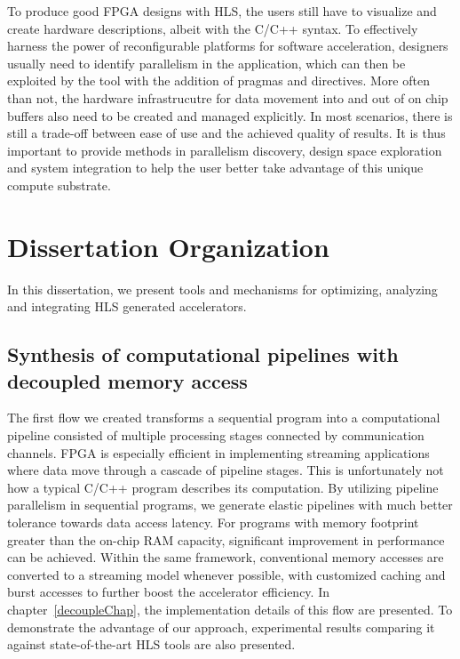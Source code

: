 To produce good FPGA designs with HLS, 
the users still have to visualize and create hardware descriptions,
albeit with the C/C++ syntax.
To effectively harness the power of reconfigurable platforms for software acceleration, designers usually need to identify parallelism
in the application, which can then be exploited by the tool with the addition of pragmas and directives. 
More often than not, the hardware infrastrucutre for data movement into and out of on chip buffers also need to be created and managed explicitly.
In most scenarios, there is still a trade-off between ease of use and the achieved quality of results. 
It is thus important to provide methods in parallelism discovery, design space exploration and system integration
to help the user better take advantage of this unique compute substrate.
\section{Dissertation Organization}

In this dissertation, we present tools and mechanisms for optimizing, analyzing and integrating HLS generated accelerators.

\subsection{Synthesis of computational pipelines with decoupled memory access}

The first flow we created transforms a sequential program into a computational pipeline consisted of multiple
processing stages connected by communication channels. FPGA is especially efficient in implementing streaming 
applications where data move through a cascade of pipeline stages. This is unfortunately not how a typical 
C/C++ program describes its computation. By utilizing pipeline parallelism in sequential programs, 
we generate elastic pipelines with much better tolerance towards data access latency.
For programs with memory footprint greater than the on-chip RAM capacity, significant improvement in performance
can be achieved. Within the same framework, conventional memory accesses are converted to a streaming model whenever
possible, with customized caching and burst accesses to further boost the accelerator efficiency. 
In chapter~\ref{decoupleChap}, the implementation details of this flow are presented. To demonstrate 
the advantage of our approach, experimental results comparing it against state-of-the-art HLS tools
are also presented.

